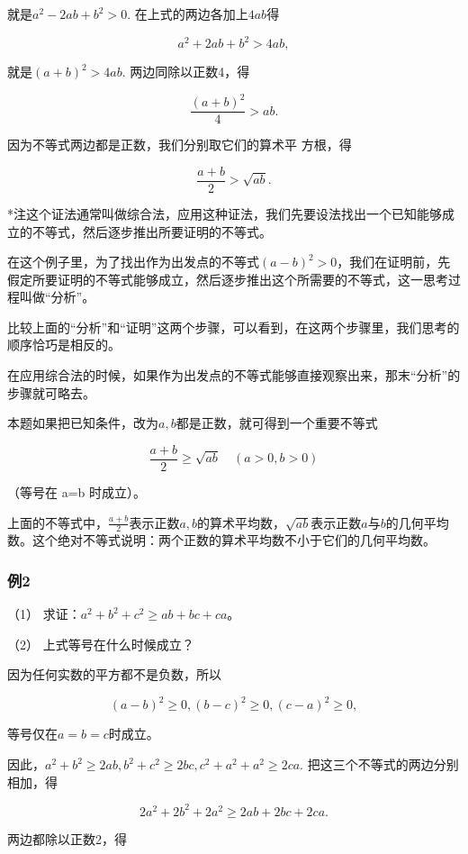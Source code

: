 就是\(a^2 - 2ab + b^2 > 0.\) 在上式的两边各加上\(4ab\)得

\[
a^{2} + 2 a b + b^{2} > 4 a b,
\]

就是\((a + b)^{2} > 4ab.\) 两边同除以正数4，得

\[
\frac{(a + b)^{2}}{4} > a b.
\]

因为不等式两边都是正数，我们分别取它们的算术平 方根，得

\[
\frac{a + b}{2} > \sqrt{a b}.
\]

*注这个证法通常叫做综合法，应用这种证法，我们先要设法找出一个已知能够成立的不等式，然后逐步推出所要证明的不等式。

在这个例子里，为了找出作为出发点的不等式\((a-b)^{2}>0\)，我们在证明前，先假定所要证明的不等式能够成立，然后逐步推出这个所需要的不等式，这一思考过程叫做``分析''。

比较上面的``分析''和``证明''这两个步骤，可以看到，在这两个步骤里，我们思考的顺序恰巧是相反的。

在应用综合法的时候，如果作为出发点的不等式能够直接观察出来，那末``分析''的步骤就可略去。

本题如果把已知条件，改为\(a, b\)都是正数，就可得到一个重要不等式

\[
\frac{a + b}{2} \geqslant \sqrt{a b} \quad (a > 0, b > 0)
\]

（等号在 a=b 时成立）。

上面的不等式中，\(\frac{a+b}{2}\)表示正数\(a, b\)的算术平均数，\(\sqrt{ab}\)表示正数\(a\)与\(b\)的几何平均数。这个绝对不等式说明：两个正数的算术平均数不小于它们的几何平均数。

\subsubsection{例2}

（1） 求证：\(a^2+b^2+c^2\geqslant ab+bc+ca\)。

（2） 上式等号在什么时候成立？

 因为任何实数的平方都不是负数，所以

\[
(a - b)^{2} \geqslant 0, (b - c)^{2} \geqslant 0, (c - a)^{2} \geqslant 0,
\]

等号仅在\(a = b = c\)时成立。

因此，\(a^2 + b^2 \geqslant 2ab, b^2 + c^2 \geqslant 2bc, c^2 + a^2 + a^2 \geqslant 2ca.\)
把这三个不等式的两边分别相加，得

\[
2 a^{2} + 2 b^{2} + 2 a^{2} \geqslant 2 a b + 2 b c + 2 c a.
\]

两边都除以正数2，得

